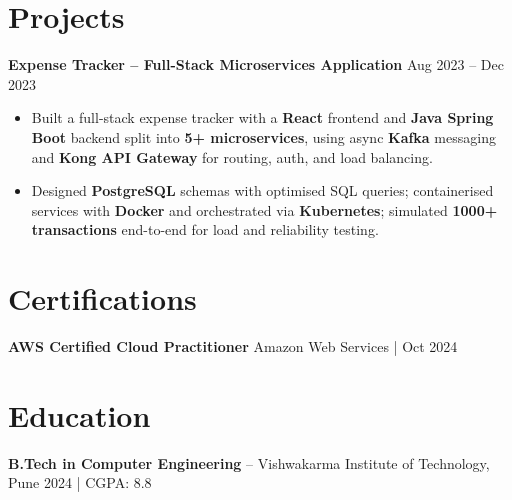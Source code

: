 \documentclass[letterpaper,10pt]{article}
\begin{document}
\section*{Projects}

\textbf{Expense Tracker -- Full-Stack Microservices Application} \hfill Aug 2023 -- Dec 2023
\begin{itemize}[leftmargin=*]
    \item Built a full-stack expense tracker with a \textbf{React} frontend and \textbf{Java Spring Boot} backend split into \textbf{5+ microservices}, using async \textbf{Kafka} messaging and \textbf{Kong API Gateway} for routing, auth, and load balancing.
    \item Designed \textbf{PostgreSQL} schemas with optimised SQL queries; containerised services with \textbf{Docker} and orchestrated via \textbf{Kubernetes}; simulated \textbf{1000+ transactions} end-to-end for load and reliability testing.
\end{itemize}

\section*{Certifications}
\textbf{AWS Certified Cloud Practitioner} \hfill Amazon Web Services \;|\; Oct 2024

\section*{Education}
\textbf{B.Tech in Computer Engineering} -- Vishwakarma Institute of Technology, Pune \hfill 2024 \;|\; CGPA: 8.8
\end{document}
